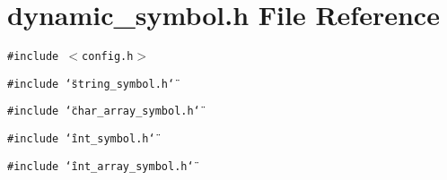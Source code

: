 \section{dynamic\_\-symbol.h File Reference}
\label{dynamic__symbol_8h}
{\tt \#include $<$config.h$>$}\par
{\tt \#include \char`\"{}string\_\-symbol.h\char`\"{}}\par
{\tt \#include \char`\"{}char\_\-array\_\-symbol.h\char`\"{}}\par
{\tt \#include \char`\"{}int\_\-symbol.h\char`\"{}}\par
{\tt \#include \char`\"{}int\_\-array\_\-symbol.h\char`\"{}}\par
